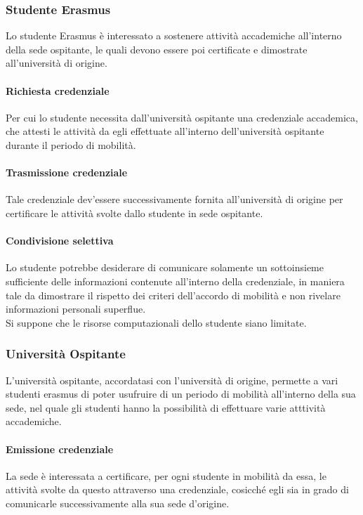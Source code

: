 \documentclass[a4paper,12pt]{article}
\begin{document}
\subsubsection{Studente Erasmus}
Lo studente Erasmus è interessato a sostenere attività accademiche all'interno della sede ospitante, le quali devono essere poi certificate e dimostrate all'università di origine.
\paragraph{Richiesta credenziale} Per cui lo studente necessita dall'università ospitante una credenziale accademica, che attesti le attività da egli effettuate all'interno dell'università ospitante durante il periodo di mobilità.
\paragraph{Trasmissione credenziale} Tale credenziale dev'essere successivamente fornita all'università di origine per certificare le attività svolte dallo studente in sede ospitante. 
\paragraph{Condivisione selettiva} Lo studente potrebbe desiderare di comunicare solamente un sottoinsieme sufficiente delle informazioni contenute all'interno della credenziale, in maniera tale da dimostrare il rispetto dei criteri dell'accordo di mobilità e non rivelare informazioni personali superflue.
\\[0.5em] Si suppone che le risorse computazionali dello studente siano limitate. 

\subsubsection{Università Ospitante}
L'università ospitante, accordatasi con l'università di origine, permette a vari studenti erasmus di poter usufruire di un periodo di mobilità all'interno della sua sede, nel quale gli studenti hanno la possibilità di effettuare varie atttività accademiche.
\paragraph{Emissione credenziale} La sede è interessata a certificare, per ogni studente in mobilità da essa, le attività svolte da questo attraverso una credenziale, cosicché egli sia in grado di comunicarle successivamente alla sua sede d'origine.
\end{document}
